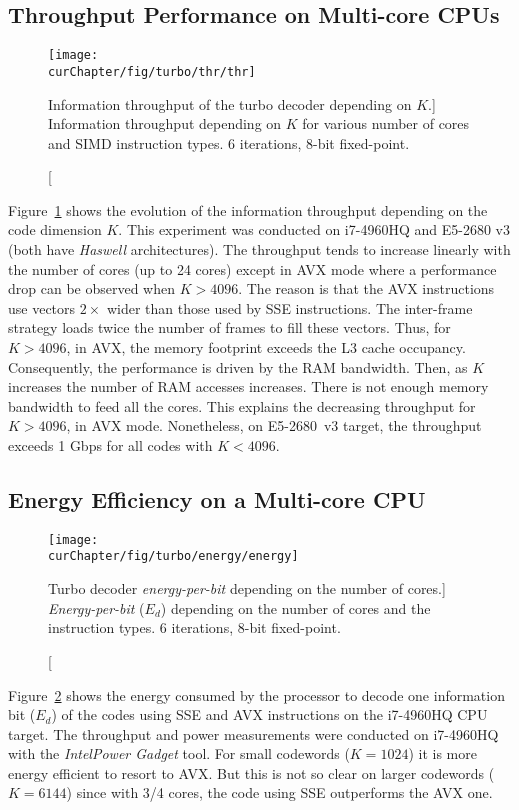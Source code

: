 \subsection{Throughput Performance on Multi-core CPUs}

\begin{figure}[htp]
  \centering
  \texttt{[image: \\curChapter/fig/turbo/thr/thr]}
  \caption
    [Information throughput of the turbo decoder depending on $K$.]
    {Information throughput depending on $K$ for various number of cores and
    SIMD instruction types. 6 iterations, 8-bit fixed-point.}
  \label{plot:eval_turbo_thr}
\end{figure}

Figure~\ref{plot:eval_turbo_thr} shows the evolution of the information
throughput depending on the code dimension $K$. This experiment was conducted on
i7-4960HQ and E5-2680 v3 (both have \emph{Haswell} architectures). The
throughput tends to increase linearly with the number of cores (up to 24 cores)
except in AVX mode where a performance drop can be observed when $K > 4096$. The
reason is that the AVX instructions use vectors $2\times$ wider than those used
by SSE instructions. The inter-frame strategy loads twice the number of frames
to fill these vectors. Thus, for $K > 4096$, in AVX, the memory footprint
exceeds the L3 cache occupancy. Consequently, the performance is driven by the
RAM bandwidth. Then, as $K$ increases the number of RAM accesses increases.
There is not enough memory bandwidth to feed all the cores. This explains the
decreasing throughput for $K > 4096$, in AVX mode. Nonetheless, on E5-2680~v3
target, the throughput exceeds 1 Gbps for all codes with $K<4096$.

\subsection{Energy Efficiency on a Multi-core CPU}

\begin{figure}[htp]
  \centering
  \texttt{[image: \\curChapter/fig/turbo/energy/energy]}
  \caption
    [Turbo decoder \emph{energy-per-bit} depending on the number of cores.]
    {\emph{Energy-per-bit} ($E_d$) depending on the number of cores and the
    instruction types. 6 iterations, 8-bit fixed-point.}
  \label{plot:eval_turbo_energy}
\end{figure}

Figure~\ref{plot:eval_turbo_energy} shows the energy consumed by the processor
to decode one information bit ($E_d$) of the codes using SSE and AVX
instructions on the i7-4960HQ CPU target. The throughput and power measurements
were conducted on i7-4960HQ with the \emph{Intel\R Power Gadget} tool. For small
codewords ($K=1024$) it is more energy efficient to resort to AVX. But this is
not so clear on larger codewords ($K=6144$) since with 3/4 cores, the code using
SSE outperforms the AVX one.

